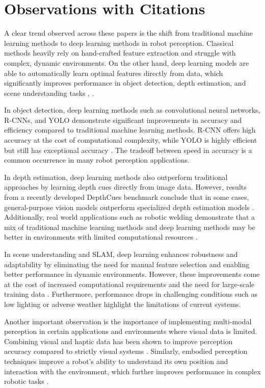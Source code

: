 \documentclass[conference]{IEEEtran}
\begin{document}
\section{Observations with Citations}
A clear trend observed across these papers is the shift from traditional machine learning methods to deep learning methods in robot perception. Classical methods heavily rely on hand-crafted feature extraction and struggle with complex, dynamic environments. On the other hand, deep learning models are able to automatically learn optimal features directly from data, which significantly improves performance in object detection, depth estimation, and scene understanding tasks \cite{masita2020}, \cite{tang2022}.
\par
In object detection, deep learning methods such as convolutional neural networks, R-CNNs, and YOLO demonstrate significant improvements in accuracy and efficiency compared to traditional machine learning methods. R-CNN offers high accuracy at the cost of computational complexity, while YOLO is highly efficient but still has exceptional accuracy \cite{gui2024}. The tradeoff between speed in accuracy is a common occurrence in many robot perception applications.
\par
In depth estimation, deep learning methods also outperform traditional approaches by learning depth cues directly from image data. However, results from a recently developed DepthCues benchmark conclude that in some cases, general-purpose vision models outperform specialized depth estimation models \cite{danier2025}. Additionally, real world applications such as robotic welding demonstrate that a mix of traditional machine learning methods and deep learning methods may be better in environments with limited computational resources \cite{wang2023}.
\par
In scene understanding and SLAM, deep learning enhances robustness and adaptability by eliminating the need for manual feature selection and enabling better performance in dynamic environments. However, these improvements come at the cost of increased computational requirements and the need for large-scale training data \cite{tang2022}. Furthermore, performance drops in challenging conditions such as low lighting or adverse weather highlight the limitations of current systems.
\par
Another important observation is the importance of implementing multi-modal perception in certain applications and environments where visual data is limited. Combining visual and haptic data has been shown to improve perception accuracy compared to strictly visual systems \cite{navarro2023}. Similarly, embodied perception techniques improve a robot’s ability to understand its own position and interaction with the environment, which further improves performance in complex robotic tasks \cite{wang2025}.
\end{document}
